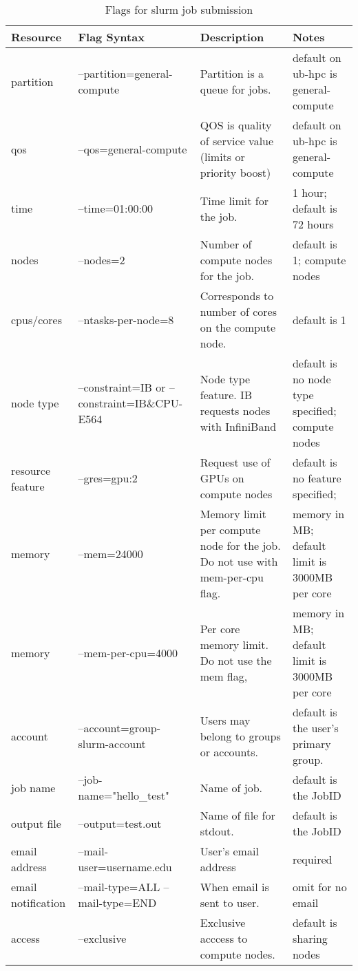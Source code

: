 \documentclass[11pt]{article}
\numberwithin{figure}{section}
\begin{document}
\begin{table}[]
\centering
\caption{Flags for slurm job submission}
\label{table:slurm-job}
    \begin{tabular}{|l|p{3cm}|p{4cm}|p{4.5cm}|}
\hline
        \textbf{
            Resource }  & \textbf{
    Flag Syntax     }            & \textbf{
    Description}
        & \textbf{
Notes                       }         \\ \hline
partition  & --partition=general-compute & Partition is a queue for jobs.                             & default on ub-hpc is general-compute \\ \hline
qos        & --qos=general-compute       & QOS is quality of service value (limits or priority boost) & default on ub-hpc is general-compute \\ \hline
time       & --time=01:00:00             & Time limit for the job.                                    & 1 hour; default is 72 hours          \\ \hline
nodes      & --nodes=2                   & Number of compute nodes for the job.                       & default is 1;  compute nodes         \\ \hline
cpus/cores & --ntasks-per-node=8         & Corresponds to number of cores on the compute node.        & default is 1                         \\ \hline

node type	& --constraint=IB 
or
        --constraint=IB\&CPU-E564 & 
Node type feature. 
        IB requests nodes with InfiniBand &
default is no node type specified;  compute nodes \\ \hline
        resource feature	& --gres=gpu:2	& Request use of GPUs on compute
        nodes	& default is no feature specified; \\ \hline
        memory &
        --mem=24000	& Memory limit per compute node for the  job.  Do not use
        with mem-per-cpu flag. &	memory in MB; default limit is 3000MB per
        core \\ \hline
        memory	& --mem-per-cpu=4000	& Per core memory limit.  Do not use
        the mem flag, &	memory in MB; default limit is 3000MB per core \\
        \hline
        account	& --account=group-slurm-account	& Users may belong to groups or
        accounts.	& default is the user's primary group. \\ \hline
        job name	& --job-name="hello\_test"	& Name of job.	& default is
        the JobID \\ \hline
        output file	& --output=test.out	& Name of file for stdout.	& default
        is the JobID \\ \hline
        email address	& --mail-user=username\@buffalo.edu	& User's email
        address	& required \\ \hline
        email notification	& --mail-type=ALL
        --mail-type=END &
        When email is sent to user.	& omit for no email \\ \hline
        access	& --exclusive	& Exclusive acccess to compute nodes.	&
        default is sharing nodes \\ \hline



\end{tabular}
\end{table}
\end{document}
